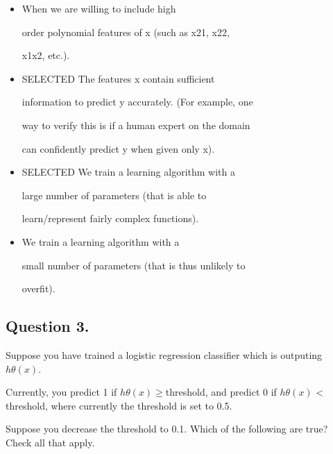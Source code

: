 \documentclass[11pt]{article} %
\begin{document}
\begin{itemize}
	\item When we are willing to include high
	
	order polynomial features of x (such as x21, x22,
	
	x1x2, etc.).
	
\item	SELECTED The features x contain sufficient
	
	information to predict y accurately. (For example, one
	
	way to verify this is if a human expert on the domain
	
	can confidently predict y when given only x).
	
	
\item 	SELECTED  We train a learning algorithm with a
	
	large number of parameters (that is able to
	
	learn/represent fairly complex functions).
	
	
	
\item 	We train a learning algorithm with a
	
	small number of parameters (that is thus unlikely to
	
	overfit).
\end{itemize}



\subsection{Question 3.}


Suppose you have trained a logistic regression classifier which is outputing $h\theta(x)$.


Currently, you predict 1 if $h\theta(x) \geq $threshold, and predict 
0 if $h\theta(x)$ < threshold, where currently the threshold is set to 0.5.

Suppose you decrease the threshold to 0.1. Which of the following are true? Check all that apply.
\end{document}
